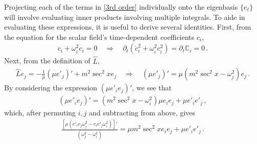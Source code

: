 \documentclass[letterpaper,11pt]{article}
\newcommand{\p}{\partial}
\newcommand{\oi}{\omega_i}
\newcommand{\oj}{\omega_j}
\begin{document}
Projecting each of the terms in \eqref{3rd order} individually onto the eigenbasis $\{ e_\ell \}$ will involve evaluating inner products involving multiple integrals. To aide in evaluating these expressions, it is useful to derive several identities. First, from the equation for the scalar field's time-dependent coefficients $c_i$,
\begin{align} 
\ddot c_i + \oi^2 c_i = 0 \quad \Rightarrow \quad \p_t \left(\dot c_i^2 + \oi^2 c_i^2 \right) = \p_t \mathbb C_i = 0 \, .
\end{align}
Next, from the definition of $\hat L$,
\begin{align}
\hat L e_j = -\frac{1}{\mu} \left( \mu e'_j \right)' + m^2 \sec^2 x e_j \quad \Rightarrow \quad \left( \mu e'_j \right)' = \mu \left( m^2 \sec^2 x - \omega_j^2 \right) e_j \, .
\end{align}
By considering the expression $\left( \mu e'_i e_j \right)'$, we see that
\begin{align}
\left( \mu e'_i e_j \right) ' = \left(m^2 \sec^2 x - \oi^2 \right) \mu e_i e_j + \mu e'_i e'_j \, ,
\end{align}
which, after permuting $i, j$ and subtracting from above, gives
\begin{align}
\frac{\left[ \mu (e'_i e_j \oj^2 - e_i e'_j \oi^2 ) \right]'}{(\oj^2 - \oi^2)} = \mu m^2 \sec^2 x e_i e_j + \mu e'_i e'_j \, .
\end{align}
\end{document}
